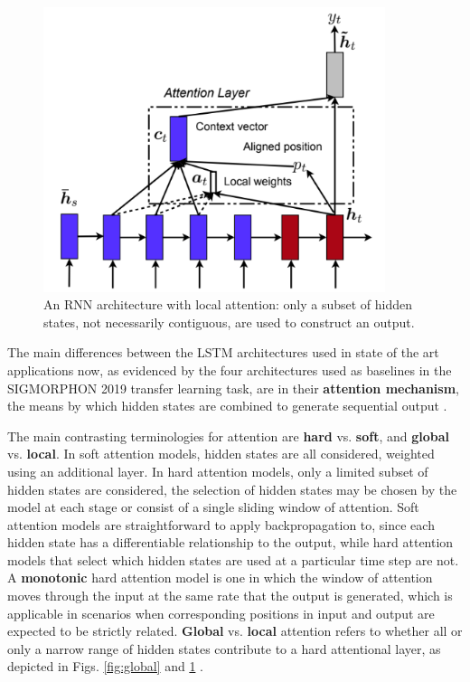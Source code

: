 \begin{figure}[p]
\includegraphics[width=10cm]{images/local.png}
\centering
\caption{An RNN architecture with local attention: only a subset of hidden states, not necessarily contiguous, are used to construct an output. \parencite{Luong2015}}
\label{fig:local}
\end{figure}

The main differences between the LSTM architectures used in state of the art applications now, as evidenced by the four architectures used as baselines in the SIGMORPHON 2019 transfer learning task, are in their \textbf{attention mechanism}, the means by which hidden states are combined to generate sequential output \parencite{Cotterell2019}. 

The main contrasting terminologies for attention are \textbf{hard} vs. \textbf{soft}, and \textbf{global} vs. \textbf{local}. In soft attention models, hidden states are all considered, weighted using an additional layer. In hard attention models, only a limited subset of hidden states are considered, the selection of hidden states may be chosen by the model at each stage or consist of a single sliding window of attention. Soft attention models are straightforward to apply backpropagation to, since each hidden state has a differentiable relationship to the output, while hard attention models that select which hidden states are used at a particular time step are not. A \textbf{monotonic} hard attention model is one in which the window of attention moves through the input at the same rate that the output is generated, which is applicable in scenarios when corresponding positions in input and output are expected to be strictly related. \textbf{Global} vs. \textbf{local} attention refers to whether all or only a narrow range of hidden states contribute to a hard attentional layer, as depicted in Figs. \ref{fig:global} and \ref{fig:local} \parencite{Luong2015}. 


